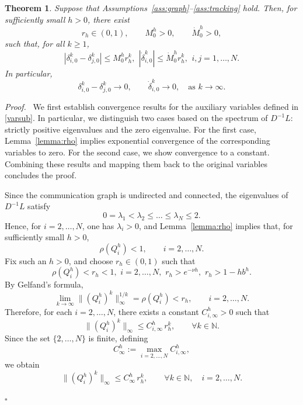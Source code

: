 \documentclass[letterpaper,journal]{IEEEtran}
\newtheorem{theorem}{Theorem}
\newenvironment{proof}{\par\noindent\textit{Proof.}\ }{\hfill$\square$\par}
\begin{document}




\begin{theorem}\label{theorem-unconstraint}
Suppose that Assumptions~\ref{ass:graph}--\ref{ass:tracking} hold. Then, for sufficiently small \(h>0\), there exist
\[
r_h\in(0,1),\qquad M_0^h>0,\qquad \dot M_0^h>0,
\]
such that, for all \(k\ge 1\),
\begin{equation}\label{eq:teo1}
    |\delta_{i,0}^k-\delta_{j,0}^k|
\le M_0^h r_h^k,
\,\ |\dot{\delta}_{i,0}^{k}|
\le \dot M_0^h r_h^k,\,\ i,j=1,\dots,N.
\end{equation}
In particular,
\[
\delta_{i,0}^k-\delta_{j,0}^k\to 0,
\qquad
\dot{\delta}_{i,0}^k\to 0,
\quad \text{as } k\to\infty.
\]
\end{theorem}
\begin{proof}
We first establish convergence results for the auxiliary variables defined in \eqref{varsub}.
In particular, we distinguish two cases based on the spectrum of \(D^{-1}L\): strictly positive eigenvalues and the zero eigenvalue. For the first case, Lemma~\ref{lemma:rho} implies exponential convergence of the corresponding variables to zero. For the second case, we show convergence to a constant.
Combining these results and mapping them back to the original variables concludes the proof.

Since the communication graph is undirected and connected, the eigenvalues of \(D^{-1}L\) satisfy
\[
0=\lambda_1<\lambda_2\le \dots \le \lambda_N\le 2.
\]
Hence, for \(i=2,\dots,N\), one has \(\lambda_i>0\), and Lemma~\ref{lemma:rho} implies that, for sufficiently small \(h>0\),
\[
\rho(Q_i^h)<1,\qquad i=2,\dots,N.
\]
Fix such an \(h>0\), and choose \(r_h\in(0,1)\) such that
\[
\rho(Q_i^h)<r_h<1,\,\, i=2,\dots,N,
\,\,
r_h>e^{-\nu h},
\,\,
r_h>1-hb^h.
\]
By Gelfand's formula,
\[
\lim_{k\to\infty}\|(Q_i^h)^k\|_\infty^{1/k}
=
\rho(Q_i^h)
<r_h,
\qquad i=2,\dots,N.
\]
Therefore, for each \(i=2,\dots,N\), there exists a constant \(C_{i,\infty}^h>0\) such that
\[
\|(Q_i^h)^k\|_\infty \le C_{i,\infty}^h\, r_h^k,
\qquad \forall k\in\mathbb N.
\]
Since the set \(\{2,\dots,N\}\) is finite, defining
\[
C_\infty^h:=\max_{i=2,\dots,N} C_{i,\infty}^h,
\]
we obtain
\[
\|(Q_i^h)^k\|_\infty \le C_\infty^h\, r_h^k,
\qquad \forall k\in\mathbb N,\quad i=2,\dots,N.
\]


\end{proof}
\end{document}
